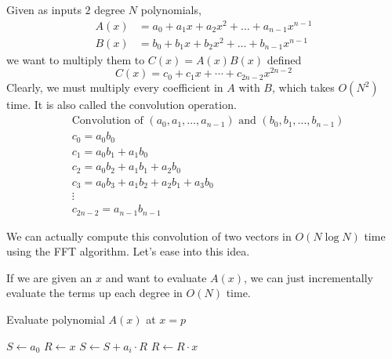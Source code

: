   Given as inputs $2$ degree $N$ polynomials, 
  \begin{align}
    A(x) & = a_0 + a_1x + a_2x^2 + \ldots + a_{n-1}x^{n-1} \\
    B(x) & = b_0 + b_1x + b_2x^2 + \ldots + b_{n-1}x^{n-1} 
  \end{align}
  we want to multiply them to $C(x) = A (x) B(x)$ defined 
  \begin{equation}
    C(x) = c_0 + c_1x + \cdots + c_{2n-2}x^{2n-2} 
  \end{equation}
  Clearly, we must multiply every coefficient in $A$ with $B$, which takes $O(N^2)$ time. It is also called the convolution operation. 
  \begin{align*}
    &\text{Convolution of } (a_0, a_1, \ldots, a_{n-1}) \text{ and } (b_0, b_1, \ldots, b_{n-1}) \\[1em]
    &c_0 = a_0 b_0 \\
    &c_1 = a_0 b_1 + a_1 b_0 \\
    &c_2 = a_0 b_2 + a_1 b_1 + a_2 b_0 \\
    &c_3 = a_0 b_3 + a_1 b_2 + a_2 b_1 + a_3 b_0 \\
    &\vdots \\
    &c_{2n-2} = a_{n-1} b_{n-1}
  \end{align*}

  We can actually compute this convolution of two vectors in $O(N \log{N})$ time using the FFT algorithm. Let's ease into this idea. 

  \begin{lemma}
    If we are given an $x$ and want to evaluate $A(x)$, we can just incrementally evaluate the terms up each degree in $O(N)$ time. 

    \begin{algorithm}[H]
      \caption{Evaluate polynomial $A(x)$ at $x=p$}
      \begin{algorithmic}[1]
      \State $S \gets a_0$
      \State $R \gets x$
          \State $S \gets S + a_i \cdot R$
          \State $R \gets R \cdot x$
      \EndFor
      \end{algorithmic}
    \end{algorithm}
  \end{lemma}

